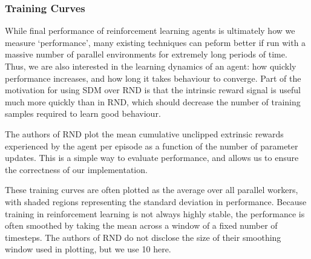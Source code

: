 \documentclass[journal, onecolumn, 12pt, draftclsnofoot]{IEEEtran}
\begin{document}
	\subsubsection{Training Curves}
	\par While final performance of reinforcement learning agents is ultimately how we measure `performance', many existing techniques can peform better if run with a massive number of parallel environments for extremely long periods of time. Thus, we are also interested in the learning dynamics of an agent: how quickly performance increases, and how long it takes behaviour to converge. Part of the motivation for using SDM over RND is that the intrinsic reward signal is useful much more quickly than in RND, which should decrease the number of training samples required to learn good behaviour.
	\par The authors of RND plot the mean cumulative unclipped extrinsic rewards experienced by the agent per episode as a function of the number of parameter updates. This is a simple way to evaluate performance, and allows us to ensure the correctness of our implementation.
	\par These training curves are often plotted as the average over all parallel workers, with shaded regions representing the standard deviation in performance. Because training in reinforcement learning is not always highly stable, the performance is often smoothed by taking the mean across a window of a fixed number of timesteps. The authors of RND do not disclose the size of their smoothing window used in plotting, but we use 10 here.
\end{document}
